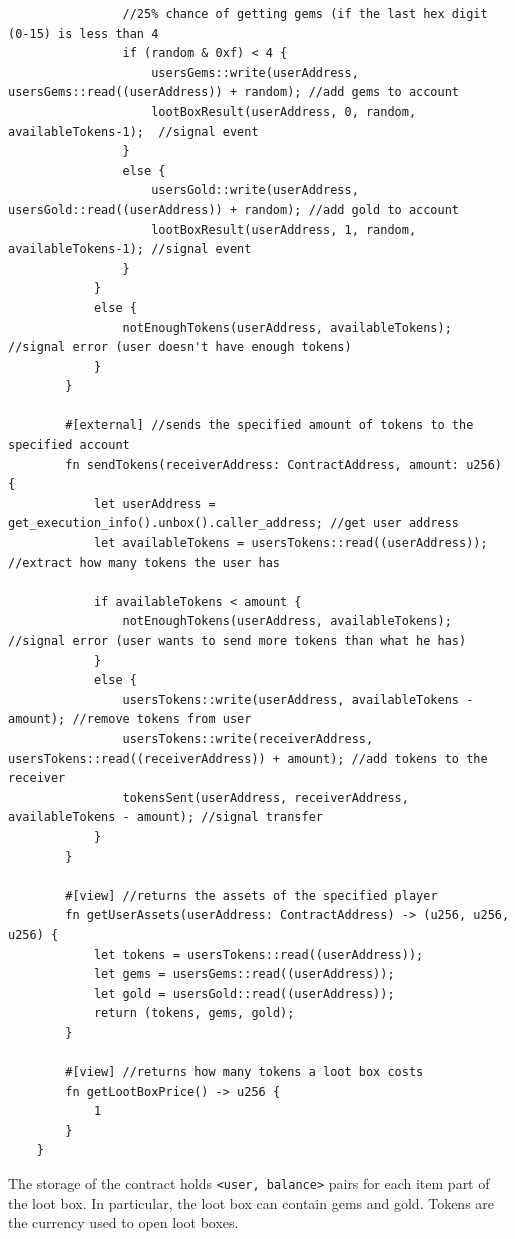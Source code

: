 \documentclass[12pt]{article}
\begin{document}
\begin{lstlisting}
                //25% chance of getting gems (if the last hex digit (0-15) is less than 4
                if (random & 0xf) < 4 {
                    usersGems::write(userAddress, usersGems::read((userAddress)) + random); //add gems to account
                    lootBoxResult(userAddress, 0, random, availableTokens-1);  //signal event
                }
                else {
                    usersGold::write(userAddress, usersGold::read((userAddress)) + random); //add gold to account
                    lootBoxResult(userAddress, 1, random, availableTokens-1); //signal event
                }
            }
            else {
                notEnoughTokens(userAddress, availableTokens); //signal error (user doesn't have enough tokens)
            }
        }

        #[external] //sends the specified amount of tokens to the specified account
        fn sendTokens(receiverAddress: ContractAddress, amount: u256) {
            let userAddress = get_execution_info().unbox().caller_address; //get user address
            let availableTokens = usersTokens::read((userAddress)); //extract how many tokens the user has
            
            if availableTokens < amount {
                notEnoughTokens(userAddress, availableTokens); //signal error (user wants to send more tokens than what he has)
            }
            else {
                usersTokens::write(userAddress, availableTokens - amount); //remove tokens from user
                usersTokens::write(receiverAddress, usersTokens::read((receiverAddress)) + amount); //add tokens to the receiver
                tokensSent(userAddress, receiverAddress, availableTokens - amount); //signal transfer
            }
        }

        #[view] //returns the assets of the specified player
        fn getUserAssets(userAddress: ContractAddress) -> (u256, u256, u256) {
            let tokens = usersTokens::read((userAddress));
            let gems = usersGems::read((userAddress));
            let gold = usersGold::read((userAddress));
            return (tokens, gems, gold);
        }

        #[view] //returns how many tokens a loot box costs
        fn getLootBoxPrice() -> u256 {
            1
        }
    }
\end{lstlisting}

The storage of the contract holds \verb|<user, balance>| pairs for each item part of the loot box. In particular, the loot box can contain gems and gold. Tokens are the currency used to open loot boxes.
\end{document}
